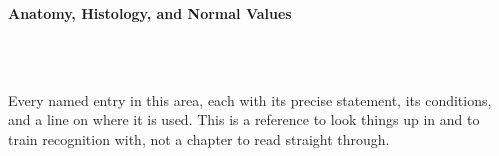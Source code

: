 



\makeindex[title={Index of This Volume},columns=2,intoc]

\begin{titlepage}\thispagestyle{empty}
\vspace*{0.14\textheight}
\noindent{\color{tiercat}\rule{\textwidth}{5pt}}\\[3pt]
\noindent{\color{bioline}\rule{\textwidth}{1pt}}\\[26pt]
\\[12pt]
\noindent\begin{minipage}{\textwidth}\raggedright
{\sffamily\bfseries\fontsize{28}{32}\selectfont\color{bioink}%
 \hyphenchar{} Anatomy, Histology, and Normal Values\par}\end{minipage}\\[16pt]
\noindent{\color{biogreen}\rule{\textwidth}{1.4pt}}\\[10pt]
\noindent\begin{minipage}{\textwidth}\raggedright
{\fontsize{10.5}{14}\selectfont\color{biogreen}%
Every named entry in this area, each with its precise statement, its conditions, and a line on
where it is used. This is a reference to look things up in and to train recognition with, not a
chapter to read straight through.\par}\end{minipage}
\vfill
\noindent{\color{bioline}\rule{\textwidth}{1pt}}\\[3pt]
\noindent{\color{tiercat}\rule{\textwidth}{5pt}}
\end{titlepage}
\tableofcontents
\clearpage
{}
\clearpage
\printindex

